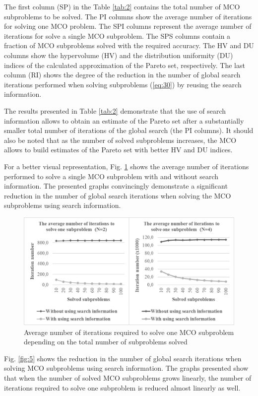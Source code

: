 \documentclass[smallextended]{svjour3}       %
\begin{document}
The first column (SP) in the Table \ref{tab:2} contains the total number of MCO subproblems to be solved. The PI columns show the average number of iterations for solving one MCO problem. The SPI columns represent the average number of iterations for solve a single MCO subproblem. The SPS columns contain a fraction of MCO subproblems solved with the required accuracy. The HV and DU columns show the hypervolume (HV) and the distribution uniformity (DU) indices of the calculated approximation of the Pareto set, respectively. The last column (RI) shows the degree of the reduction in the number of global search iterations performed when solving subproblems (\ref{eq:30}) by reusing the search information.

The results presented in Table \ref{tab:2} demonstrate that the use of search information allows to obtain an estimate of the Pareto set after a substantially smaller total number of iterations of the global search (the PI columns). It should also be noted that as the number of solved subproblems increases, the MCO allows to build estimates of the Pareto set with better HV and DU indices.

For a better visual representation, Fig. \ref{fig:4} shows the average number of iterations performed to solve a single MCO subproblem with and without search information. The presented graphs convincingly demonstrate a significant reduction in the number of global search iterations when solving the MCO subproblems using search information.

\begin{figure}
  \centering
  \includegraphics[width=1\linewidth]{fig4}
  \caption{Average number of iterations required to solve one MCO subproblem depending on the total number of subproblems solved}
  \label{fig:4}
\end{figure}

Fig. \ref{fig:5} shows the reduction in the number of global search iterations when solving MCO subproblems using search information. The graphs presented show that when the number of solved MCO subproblems grows linearly, the number of iterations required to solve one subproblem is reduced almost linearly as well.
\end{document}

